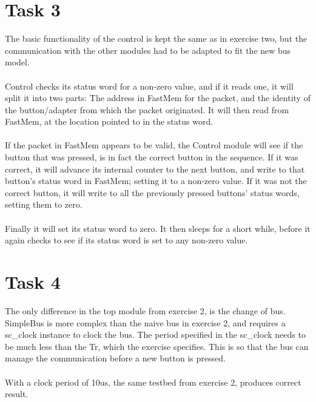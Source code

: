 \documentclass[11pt]{report}
\begin{document}
  



\section*{Task 3}
The basic functionality of the control is kept the same as in exercise two, but
the communication with the other modules had to be adapted to fit the new bus
model.\\
\\Control checks its status word for a non-zero value, and if it reads one, it
will split it into two parts: The address in FastMem for the packet, and the
identity of the button/adapter from which the packet originated. It will then
read from FastMem, at the location pointed to in the status word.\\
\\If the packet in FastMem appears to be valid, the Control module will see if
the button that was pressed, is in fact the correct button in the sequence. If
it was correct, it will advance its internal counter to the next button, and
write to that button's status word in FastMem; setting it to a non-zero value.
If it was not the correct button, it will write to all the previously pressed
buttons' status words, setting them to zero.\\
\\Finally it will set its status word to zero. It then sleeps for a short 
while, before it again checks to see if its status word is set to any non-zero 
value.

\section*{Task 4}
The only difference in the top module from exercise 2, is the change of bus.
SimpleBus is more complex than the naive bus in exercise 2, and requires a
sc\_clock instance to clock the bus. The period specified in the sc\_clock needs
to be much less than the Tr, which the exercise specifies. This is so that the
bus can manage the communication before a new button is pressed.\\
\\With a clock period of 10us, the same testbed from exercise 2, produces
correct result. 
\end{document}
